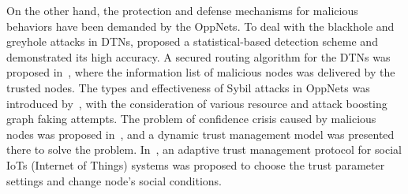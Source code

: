 On the other hand,
the protection and defense mechanisms for malicious behaviors have
been demanded by the OppNets.
To deal with the blackhole and greyhole attacks
in DTNs,
\cite{Pham2016Detecting} proposed 
a statistical-based detection scheme and
demonstrated its high accuracy.
A secured routing algorithm for the DTNs
was proposed in~\cite{Saha2018Design},
where the information list of malicious nodes 
was delivered by the trusted nodes.
The types and effectiveness of Sybil attacks in OppNets
was introduced by~\cite{Sacha2016Stalk},
with the consideration of various resource and
attack boosting graph faking attempts.
The problem of confidence crisis caused by malicious nodes
was proposed in~\cite{Yao2016Secure},
and a dynamic trust management model
was presented there to solve the problem.
In~\cite{Chen2016Trust},
an adaptive trust management
protocol for social IoTs (Internet of Things) systems was proposed
to choose the trust parameter settings and change node's social conditions.
%
